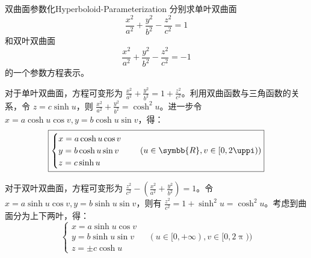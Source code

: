 \begin{problem}{双曲面参数化}{Hyperboloid-Parameterization}
    分别求单叶双曲面
    \begin{equation}
        \frac{x^2}{a^2} + \frac{y^2}{b^2} - \frac{z^2}{c^2} = 1
    \end{equation}
    和双叶双曲面
    \begin{equation}
        \frac{x^2}{a^2} + \frac{y^2}{b^2} - \frac{z^2}{c^2} = -1
    \end{equation}
    的一个参数方程表示。
\end{problem}

\begin{solution}

    对于单叶双曲面，方程可变形为 $\frac{x^2}{a^2} + \frac{y^2}{b^2} = 1 + \frac{z^2}{c^2}$。利用双曲函数与三角函数的关系，令 $z = c \sinh u$，则 $\frac{x^2}{a^2} + \frac{y^2}{b^2} = \cosh^2 u$。进一步令 $x = a \cosh u \cos v, y = b \cosh u \sin v$，得：
    \begin{equation}
        \boxed{\begin{cases} x = a \cosh u \cos v \\ y = b \cosh u \sin v \\ z = c \sinh u \end{cases} \quad (u \in \symbb{R}, v \in [0, 2\uppi))}
    \end{equation}


    对于双叶双曲面，方程可变形为 $\frac{z^2}{c^2} - \left( \frac{x^2}{a^2} + \frac{y^2}{b^2} \right) = 1$。令 $x = a \sinh u \cos v, y = b \sinh u \sin v$，则有 $\frac{z^2}{c^2} = 1 + \sinh^2 u = \cosh^2 u$。考虑到曲面分为上下两叶，得：
    \begin{equation}
        \boxed{\begin{cases} x = a \sinh u \cos v \\ y = b \sinh u \sin v \\ z = \pm c \cosh u \end{cases} \quad (u \in [0, +\infty), v \in [0, 2\uppi))}
    \end{equation}
\end{solution}

\endinput
